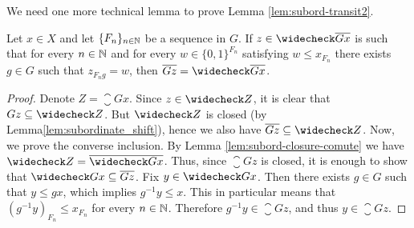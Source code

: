 \noindent
We need one more technical lemma to prove Lemma \ref{lem:subord-transit2}.

\begin{lem}\label{lem:subord-transit1}
Let $x\in X$ and let $\{F_n\}_{n\in\mathbb{N}}$ be a \Folner sequence in $G$. If $z\in\subord{\closure{Gx}}$ is such that for every $n\in\mathbb{N}$ and for every $w\in\{0,1\}^{F_n}$ satisfying $w\leq x_{F_n}$ there exists $g\in G$ such that $z_{F_ng}=w$, then $\closure{Gz}=\subord{\closure{Gx}}$.
\end{lem}

\begin{proof}
Denote $Z=\closure{Gx}$.
Since $z\in\subord{Z}$, it is clear that ${Gz}\subseteq \subord{Z}$. But $\subord{Z}$ is closed (by Lemma\ref {lem:subordinate_shift}), hence we also have $\closure{{Gz}}\subseteq \subord{Z}$. Now, we prove the converse inclusion. By Lemma \ref{lem:subord-closure-comute} we have $\subord{Z}=\closure{\subord{Gx}}$. Thus, since $\closure{Gz}$ is closed, it is enough to show that $\subord{Gx}\subseteq \closure{Gz}$. Fix $y\in \subord{Gx}$. Then there exists $g\in G$ such that $y\leq gx$, which implies $g^{-1}y\leq x$. This in particular means that $(g^{-1}y)_{F_n}\leq x_{F_n}$ for every $n\in\mathbb{N}$. Therefore $g^{-1}y\in\closure{Gz}$, and thus $y\in\closure{Gz}$.
\end{proof}


